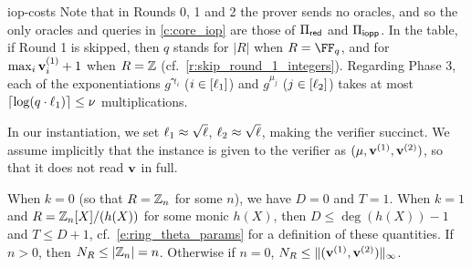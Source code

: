 \begin{lncsappendix}{iop-costs}
Note that in Rounds 0, 1 and 2 the prover sends no oracles, and so the only oracles and queries in \cref{c:core_iop} are those of $\Pi_{\mathsf{red}}$ and $\Pi_{\mathsf{iopp}}$. In the table, if Round 1 is skipped, then $q$ stands for $|R|$ when $R=\FF_q$, and for $\max_i \mathbf{v}^{(1)}_i+1$ when $R=\mathbb{Z}$ (cf.\ \cref{r:skip_round_1_integers}). Regarding Phase 3, each of the exponentiations $g^{\bm{\gamma}_i}$ ($i\in [\ell_1]$) and $g^{\mu_j}$ ($j\in [\ell_2]$) takes at most $\lceil \log(q\cdot\ell_1)\rceil \leq \nu$ multiplications.


In our instantiation, we set $\ell_1\approx \sqrt{\ell}$, $\ell_2\approx \sqrt{\ell}$, making the verifier succinct.  We assume implicitly that the instance is given to the verifier as $(\mu,\mathbf{v}^{(1)},\mathbf{v}^{(2)})$, so that it does not read $\mathbf{v}$ in full.

When $k=0$ (so that $R=\mathbb{Z}_n$ for some $n$), we have $D=0$ and $T=1$.  When $k=1$ and $R=\mathbb{Z}_n[X]/(h(X))$ for some monic $h(X)$, then $D\leq \deg(h(X))-1$ and $T\leq D
+1$, cf.\ \eqref{e:ring_theta_params} for a definition of these quantities. If $n>0$, then $N_R\leq |\mathbb{Z}_n|=n$. Otherwise if $n=0$, $N_R \leq \lVert (\mathbf{v}^{(1)}, \mathbf{v}^{(2)})\rVert_\infty$.




\end{lncsappendix}
